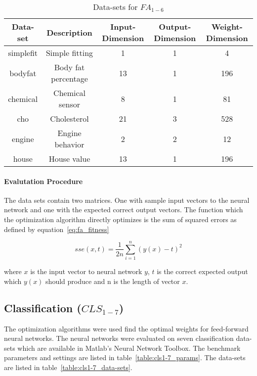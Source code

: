 \begin{table}[H]
  \centering
  \begin{center}
    \footnotesize
    \begin{tabular}{ | c | c | c | c | c | }
      \hline
      Data-set & Description & Input-Dimension & Output-Dimension & Weight-Dimension \\ \hline
      simplefit & Simple fitting & 1 & 1 & 4 \\ \hline
      bodyfat & Body fat percentage & 13 & 1 & 196 \\ \hline
      chemical & Chemical sensor & 8 & 1 & 81 \\ \hline
      cho & Cholesterol & 21 & 3 & 528 \\ \hline
      engine & Engine behavior  & 2 & 2 & 12 \\ \hline
      house & House value & 13 & 1 & 196 \\ \hline
    \end{tabular}
  \end{center}
  \caption{Data-sets for $FA_{1-6}$}
  \label{table:fa1-6_data-sets}
\end{table}

\paragraph{Evalutation Procedure}

The data sets contain two matrices. One with sample input vectors to the neural network and one with the expected correct output vectors. The function which the optimization algorithm directly optimizes is the sum of squared errors as defined by equation~\ref{eq:fa_fitness}

\begin{equation} \label{eq:fa_fitness}
  sse(x,t) = \frac{1}{2n} \sum_{i=1}^{n}{(y(x)-t)^2}
\end{equation}

where $x$ is the input vector to neural network $y$, $t$ is the correct expected output which $y(x)$ should produce and n is the length of vector $x$.

\subsection{Classification ($CLS_{1-7}$)}

The optimization algorithms were used find the optimal weights for feed-forward neural networks. The neural networks were evaluated on seven classification data-sets which are available in Matlab's Neural Network Toolbox. The benchmark parameters and settings are listed in table~\ref{table:cls1-7_params}. The data-sets are listed in table~\ref{table:cls1-7_data-sets}.

